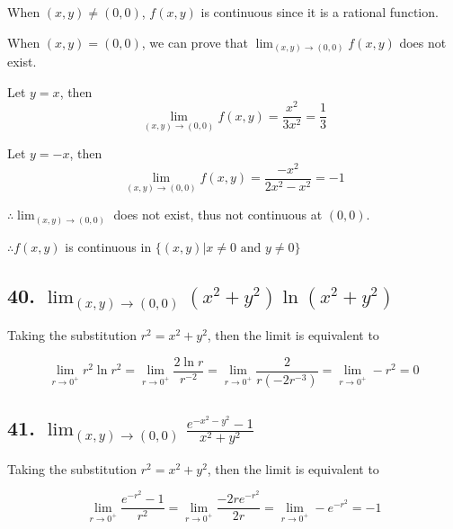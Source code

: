 \documentclass{article}
\begin{document}
    When $(x, y) \not = (0, 0)$, $f(x, y)$ is continuous since it is a rational function.

    When $(x, y) = (0, 0)$, we can prove that $\lim_{(x, y) \to (0, 0)}f(x, y)$ does not exist.

    Let $y = x$, then $$\lim_{(x, y) \to (0, 0)} f(x, y) = \frac{x^2}{3x^2} = \frac 1 3$$

    Let $y = -x$, then $$\lim_{(x, y) \to (0, 0)} f(x, y) = \frac{-x^2}{2x^2 - x^2} = -1$$

    $\therefore \lim_{(x, y) \to (0, 0)}$ does not exist, thus not continuous at $(0, 0)$.

    $\therefore f(x, y)$ is continuous in $\{  (x, y) | x \not = 0 \textrm{ and } y \not = 0 \}$

    \subsection*{40. $\lim_{(x, y) \to (0, 0)} (x^2 + y^2) \ln (x^2 + y^2)$}

    Taking the substitution $r^2 = x^2 + y^2$, then the limit is equivalent to

    $$\lim_{r \to 0^+} r^2 \ln r^2 = \lim_{r\to 0^+} \frac{2\ln r}{r^{-2}} = \lim_{r\to 0^+}\frac{2}{r(-2r^{-3})} = \lim_{r \to 0^+}-r^2 = 0$$

    \subsection*{41. $\lim_{(x, y) \to (0, 0)} \frac{e^{-x^2-y^2} - 1}{x^2 + y^2}$}

    Taking the substitution $r^2 = x^2 + y^2$, then the limit is equivalent to 

    $$\lim_{r\to 0^+} \frac{e^{-r^2} - 1}{r^2} = \lim_{r\to0^+}\frac{-2re^{-r^2}}{2r} = \lim_{r\to 0^+}-e^{-r^2} = -1$$
\end{document}
